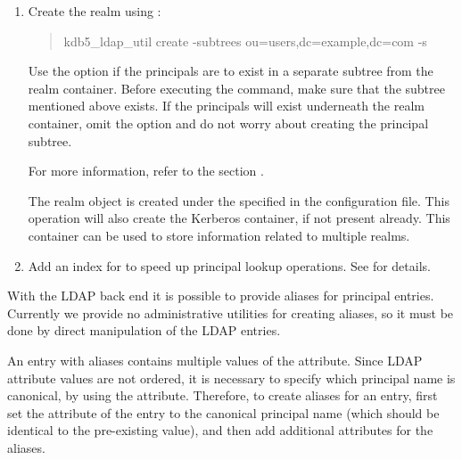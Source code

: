 \documentclass[letterpaper,10pt,english]{sphinxmanual}
\begin{document}
\begin{enumerate}
\item {} 
Create the realm using {\hyperref[\detokenize{admin/admin_commands/kdb5_ldap_util:kdb5-ldap-util-8}]{}}:
\begin{quote}

kdb5\_ldap\_util create -subtrees ou=users,dc=example,dc=com -s
\end{quote}

Use the  option if the principals are to exist in a
separate subtree from the realm container.  Before executing the
command, make sure that the subtree mentioned above
 exists.  If the principals will
exist underneath the realm container, omit the  option
and do not worry about creating the principal subtree.

For more information, refer to the section {\hyperref[\detokenize{admin/database:ops-on-ldap}]{}}.

The realm object is created under the
 specified in the configuration
file.  This operation will also create the Kerberos container, if
not present already.  This container can be used to store
information related to multiple realms.

\item {} 
Add an  index for  to speed up principal
lookup operations.  See
 for
details.

\end{enumerate}

With the LDAP back end it is possible to provide aliases for principal
entries.  Currently we provide no administrative utilities for
creating aliases, so it must be done by direct manipulation of the
LDAP entries.

An entry with aliases contains multiple values of the
 attribute.  Since LDAP attribute values are not
ordered, it is necessary to specify which principal name is canonical,
by using the  attribute.  Therefore, to create
aliases for an entry, first set the  attribute of
the entry to the canonical principal name (which should be identical
to the pre-existing  value), and then add additional
 attributes for the aliases.
\end{document}
